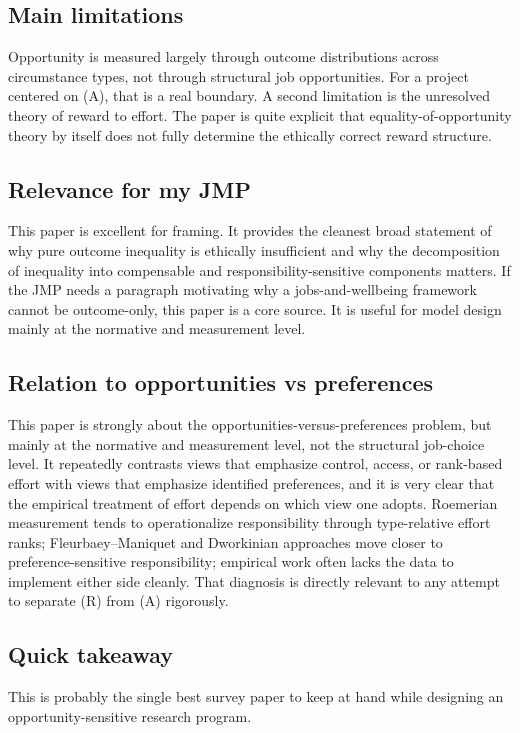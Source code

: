 \documentclass[11pt,a4paper]{article}
\begin{document}
\subsection*{Main limitations}
Opportunity is measured largely through outcome distributions across circumstance types, not through structural job opportunities. For a project centered on (A), that is a real boundary. A second limitation is the unresolved theory of reward to effort. The paper is quite explicit that equality-of-opportunity theory by itself does not fully determine the ethically correct reward structure.

\subsection*{Relevance for my JMP}
This paper is excellent for framing. It provides the cleanest broad statement of why pure outcome inequality is ethically insufficient and why the decomposition of inequality into compensable and responsibility-sensitive components matters. If the JMP needs a paragraph motivating why a jobs-and-wellbeing framework cannot be outcome-only, this paper is a core source. It is useful for model design mainly at the normative and measurement level.

\subsection*{Relation to opportunities vs preferences}
This paper is strongly about the opportunities-versus-preferences problem, but mainly at the normative and measurement level, not the structural job-choice level. It repeatedly contrasts views that emphasize control, access, or rank-based effort with views that emphasize identified preferences, and it is very clear that the empirical treatment of effort depends on which view one adopts. Roemerian measurement tends to operationalize responsibility through type-relative effort ranks; Fleurbaey–Maniquet and Dworkinian approaches move closer to preference-sensitive responsibility; empirical work often lacks the data to implement either side cleanly. That diagnosis is directly relevant to any attempt to separate (R) from (A) rigorously.

\subsection*{Quick takeaway}
This is probably the single best survey paper to keep at hand while designing an opportunity-sensitive research program.
\end{document}
